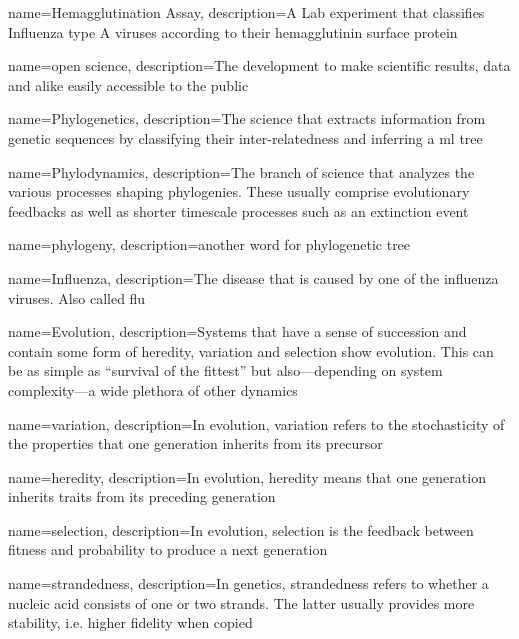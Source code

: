 {
    name=Hemagglutination Assay,
    description={A Lab experiment that classifies Influenza type A viruses according to their hemagglutinin surface protein}
}

{
    name=open science,
    description={The development to make scientific results, data and alike easily accessible to the public}
}

{
    name=Phylogenetics,
    description={The science that extracts information from genetic sequences by classifying their inter-relatedness and inferring a \acrshort{ml} tree}
}

{
    name=Phylodynamics,
    description={The branch of science that analyzes the various processes shaping phylogenies. These usually comprise evolutionary feedbacks as well as shorter timescale processes such as an extinction event}
}

{
    name=phylogeny,
    description={another word for phylogenetic tree}
}

{
    name=Influenza,
    description={The disease that is caused by one of the influenza viruses. Also called flu}
}

{
    name=Evolution,
    description={Systems that have a sense of succession and contain some form of \gls{heredity}, \gls{variation} and \gls{selection} show evolution. This can be as simple as ``survival of the fittest'' but also---depending on system complexity---a wide plethora of other dynamics}
}

{
    name=variation,
    description={In \gls{evolution}, variation refers to the stochasticity of the properties that one generation inherits from its precursor}
}

{
    name=heredity,
    description={In \gls{evolution}, heredity means that one generation inherits traits from its preceding generation}
}

{
    name=selection,
    description={In \gls{evolution}, selection is the feedback between fitness and probability to produce a next generation}
}

{
    name=strandedness,
    description={In genetics, strandedness refers to whether a nucleic acid consists of one or two strands. The latter usually provides more stability, i.e. higher fidelity when copied}
}

